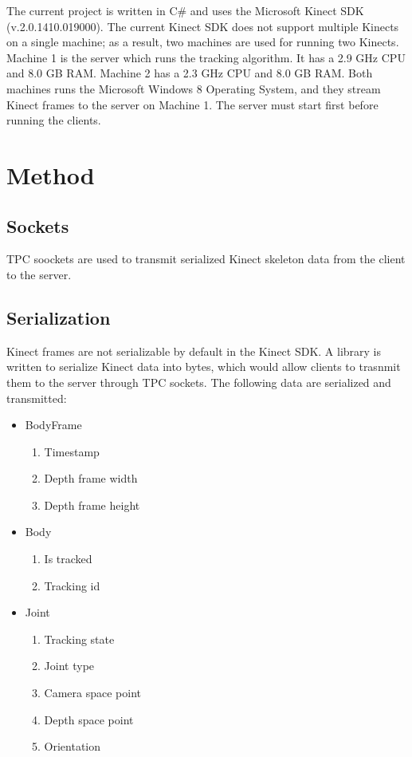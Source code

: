 \documentclass[paper=a4, fontsize=11pt]{scrartcl}
\numberwithin{equation}{section}		%
\numberwithin{figure}{section}			%
\numberwithin{table}{section}				%
\begin{document}
The current project is written in C\# and uses the Microsoft Kinect SDK (v.2.0.1410.019000). The current Kinect SDK does not support multiple Kinects on a single machine; as a result, two machines are used for running two Kinects. Machine 1 is the server which runs the tracking algorithm. It has a 2.9 GHz CPU and 8.0 GB RAM. Machine 2 has a 2.3 GHz CPU and 8.0 GB RAM. Both machines runs the Microsoft Windows 8 Operating System, and they stream Kinect frames to the server on Machine 1. The server must start first before running the clients.

\section{Method}

\subsection{Sockets}

TPC soockets are used to transmit serialized Kinect skeleton data from the client to the server.

\subsection{Serialization}

Kinect frames are not serializable by default in the Kinect SDK. A library is written to serialize Kinect data into bytes, which would allow clients to trasnmit them to the server through TPC sockets. The following data are serialized and transmitted:

\begin{itemize}
	\item BodyFrame
		\begin{enumerate}
			\item Timestamp
			\item Depth frame width
			\item Depth frame height
		\end{enumerate}
	\item Body
		\begin{enumerate}
			\item Is tracked
			\item Tracking id
		\end{enumerate}
	\item Joint
	  	\begin{enumerate}
			\item Tracking state
			\item Joint type
			\item Camera space point
			\item Depth space point
			\item Orientation
		\end{enumerate}
\end{itemize}
\end{document}
